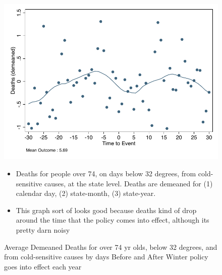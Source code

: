\documentclass[12pt]{article}
\begin{document}
\begin{figure}
\centering
\caption{Average Demeaned Deaths for over 74 yr olds, below 32 degrees, and from cold-sensitive causes by days Before and After Winter policy goes into effect each year}
\includegraphics{figures/te_deaths_old_ewm_cold.pdf} \\
\begin{itemize}
\item Deaths for people over 74, on days below 32 degrees, from cold-sensitive causes, at the state level.  Deaths are demeaned for (1) calendar day, (2) state-month, (3) state-year.
\item This graph sort of looks good because deaths kind of drop around the time that the policy comes into effect, although its pretty darn noisy
\end{itemize}
\end{figure}









\end{document}
